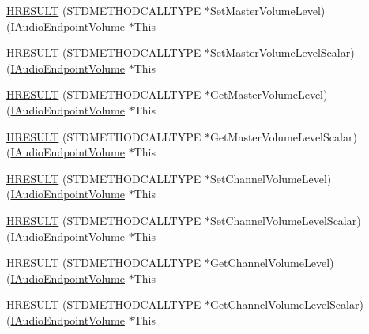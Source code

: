 \begin{DoxyCompactItemize}
\item 
\hyperlink{struct_i_audio_endpoint_volume_vtbl_adb3c080b7ac59dfee35d283dd07fbf3b}{H\+R\+E\+S\+U\+LT} (S\+T\+D\+M\+E\+T\+H\+O\+D\+C\+A\+L\+L\+T\+Y\+PE $\ast$Set\+Master\+Volume\+Level)(\hyperlink{endpointvolume_8h_a0aa518a24cb3834bf372f46cfc94e3cf}{I\+Audio\+Endpoint\+Volume} $\ast$This
\item 
\hyperlink{struct_i_audio_endpoint_volume_vtbl_a0b61f8a731d4563e320f54cf8596e5a3}{H\+R\+E\+S\+U\+LT} (S\+T\+D\+M\+E\+T\+H\+O\+D\+C\+A\+L\+L\+T\+Y\+PE $\ast$Set\+Master\+Volume\+Level\+Scalar)(\hyperlink{endpointvolume_8h_a0aa518a24cb3834bf372f46cfc94e3cf}{I\+Audio\+Endpoint\+Volume} $\ast$This
\item 
\hyperlink{struct_i_audio_endpoint_volume_vtbl_ac1bfb5bac746c6b3a36ce727d52a53bd}{H\+R\+E\+S\+U\+LT} (S\+T\+D\+M\+E\+T\+H\+O\+D\+C\+A\+L\+L\+T\+Y\+PE $\ast$Get\+Master\+Volume\+Level)(\hyperlink{endpointvolume_8h_a0aa518a24cb3834bf372f46cfc94e3cf}{I\+Audio\+Endpoint\+Volume} $\ast$This
\item 
\hyperlink{struct_i_audio_endpoint_volume_vtbl_a05768aca51eda340511ed8f9487856e3}{H\+R\+E\+S\+U\+LT} (S\+T\+D\+M\+E\+T\+H\+O\+D\+C\+A\+L\+L\+T\+Y\+PE $\ast$Get\+Master\+Volume\+Level\+Scalar)(\hyperlink{endpointvolume_8h_a0aa518a24cb3834bf372f46cfc94e3cf}{I\+Audio\+Endpoint\+Volume} $\ast$This
\item 
\hyperlink{struct_i_audio_endpoint_volume_vtbl_aa1fc083faaed0aa640cd59d22d4ea43c}{H\+R\+E\+S\+U\+LT} (S\+T\+D\+M\+E\+T\+H\+O\+D\+C\+A\+L\+L\+T\+Y\+PE $\ast$Set\+Channel\+Volume\+Level)(\hyperlink{endpointvolume_8h_a0aa518a24cb3834bf372f46cfc94e3cf}{I\+Audio\+Endpoint\+Volume} $\ast$This
\item 
\hyperlink{struct_i_audio_endpoint_volume_vtbl_a0a020de17bd18019385302cee72e4d21}{H\+R\+E\+S\+U\+LT} (S\+T\+D\+M\+E\+T\+H\+O\+D\+C\+A\+L\+L\+T\+Y\+PE $\ast$Set\+Channel\+Volume\+Level\+Scalar)(\hyperlink{endpointvolume_8h_a0aa518a24cb3834bf372f46cfc94e3cf}{I\+Audio\+Endpoint\+Volume} $\ast$This
\item 
\hyperlink{struct_i_audio_endpoint_volume_vtbl_a4ddab1a75e0740e05debc01edd667cc6}{H\+R\+E\+S\+U\+LT} (S\+T\+D\+M\+E\+T\+H\+O\+D\+C\+A\+L\+L\+T\+Y\+PE $\ast$Get\+Channel\+Volume\+Level)(\hyperlink{endpointvolume_8h_a0aa518a24cb3834bf372f46cfc94e3cf}{I\+Audio\+Endpoint\+Volume} $\ast$This
\item 
\hyperlink{struct_i_audio_endpoint_volume_vtbl_a32dd2c3385641ceeb8ff76e6c575de08}{H\+R\+E\+S\+U\+LT} (S\+T\+D\+M\+E\+T\+H\+O\+D\+C\+A\+L\+L\+T\+Y\+PE $\ast$Get\+Channel\+Volume\+Level\+Scalar)(\hyperlink{endpointvolume_8h_a0aa518a24cb3834bf372f46cfc94e3cf}{I\+Audio\+Endpoint\+Volume} $\ast$This

\end{DoxyCompactItemize}
